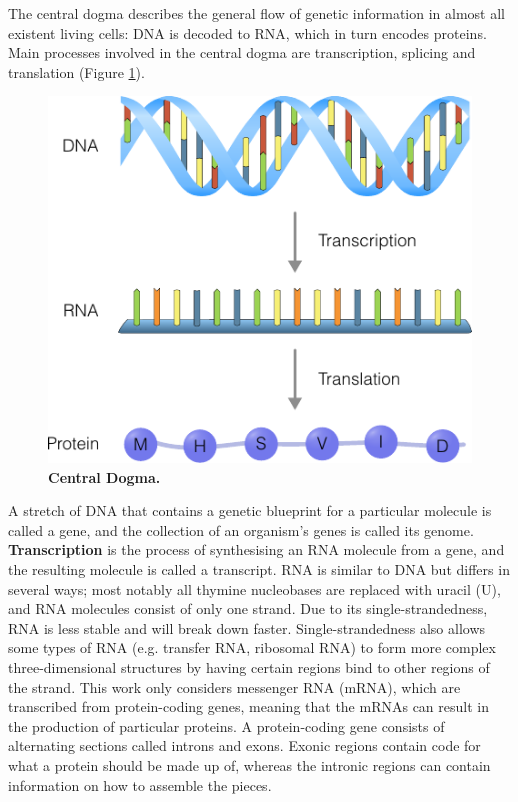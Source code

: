 The central dogma describes the general flow of genetic information in almost all existent living cells: DNA is decoded to RNA, which in turn encodes proteins. Main processes involved in the central dogma are transcription, splicing and translation (Figure \ref{fig:centraldogma}). 

\begin{figure}[htb!]
  \centering\includegraphics[width=.5\linewidth]{fig/central_dogma} %
  \caption{
    \textbf{Central Dogma.} %
  }
  \label{fig:centraldogma}
\end{figure}

A stretch of DNA that contains a genetic blueprint for a particular molecule is called a gene, and the collection of an organism's genes is called its genome. \textbf{Transcription} is the process of synthesising an RNA molecule from a gene, and the resulting molecule is called a transcript. RNA is similar to DNA but differs in several ways; most notably all thymine nucleobases are replaced with uracil (U), and RNA molecules consist of only one strand.
Due to its single-strandedness, RNA is less stable and will break down faster. Single-strandedness also allows some types of RNA (e.g. transfer RNA, ribosomal RNA) to form more complex three-dimensional structures by having certain regions bind to other regions of the strand. This work only considers messenger RNA (mRNA), which are transcribed from protein-coding genes, meaning that the mRNAs can result in the production of particular proteins. A protein-coding gene consists of alternating sections called introns and exons. Exonic regions contain code for what a protein should be made up of, whereas the intronic regions can contain information on how to assemble the pieces.

